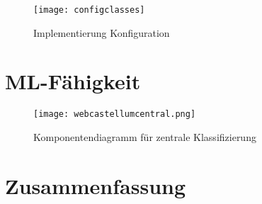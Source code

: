 \begin{figure}[h]
  \begin{center}
    \texttt{[image: configclasses]}
    \caption{Implementierung Konfiguration}
    \label{fig.impkonfig}
  \end{center}
\end{figure}



\section{ML-Fähigkeit}

\begin{figure}[h]
    \centering
    \texttt{[image: webcastellumcentral.png]}
    \caption{Komponentendiagramm für zentrale Klassifizierung}
    \label{fig:my_future}
\end{figure}



\section{Zusammenfassung}



